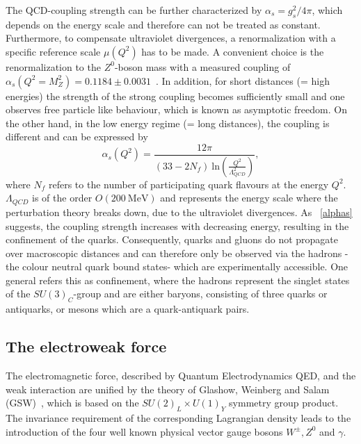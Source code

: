 \noindent The QCD-coupling strength can be further characterized by  $\alpha_s = g_s^2/4\pi$, which depends  on the energy scale and therefore can not be treated as constant. Furthermore, to compensate ultraviolet divergences, a renormalization with a specific reference scale $\mu(Q^2)$ has to be made. A convenient choice is the renormalization to the $Z^0$-boson mass with a measured coupling of $\alpha_s(Q^2=M_Z^2) = 0.1184 \pm 0.0031$~\cite{Bethke:2000ai}. In addition, for short distances (= high energies) the strength of the strong coupling becomes sufficiently small and one observes free particle like behaviour, which is known as asymptotic freedom. On the other hand, in the low energy regime (= long distances), the coupling is different and can be expressed by 
\begin{equation}\label{alphas}
\alpha_s(Q^2)=\frac{12\pi}{(33-2N_f)~\text{ln}(\frac{Q^2}{\Lambda_{QCD}^2})},
\end{equation}
where $N_f$ refers to the number of participating quark flavours at the energy $Q^2$. $\Lambda_{QCD}$ is of the order $O(200~\text{MeV})$ and represents the energy scale where the perturbation theory  breaks down, due to the ultraviolet divergences. As ~\cref{alphas} suggests, the coupling strength increases with decreasing energy, resulting in the confinement of the quarks. Consequently, quarks and gluons do not propagate over macroscopic distances and can therefore only be observed via the hadrons -the colour neutral quark bound states- which are experimentally accessible. One general refers this as confinement, where the hadrons represent the singlet states of  the $SU(3)_C$-group and are either baryons, consisting of three quarks or antiquarks,  or mesons which are a quark-antiquark pairs. 
























\subsection{The electroweak force}\label{EW}
The electromagnetic force, described by Quantum Electrodynamics QED, and the weak interaction are unified by the theory of Glashow, Weinberg and Salam (GSW)~\cite{Glashow:1961tr,Weinberg:1967tq,Salam:1964ry}, which is based on the $SU(2)_L\times U(1)_Y$ symmetry group product. The invariance requirement of the corresponding Lagrangian density leads to the introduction of the four well known physical vector gauge bosons $W^{\pm}, Z^0$ and $\gamma$.

